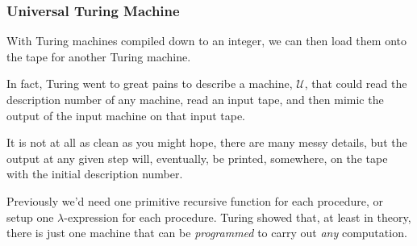 \documentclass{beamer}
\begin{document}
\begin{frame}
	\frametitle{Universal Turing Machine}

	With Turing machines compiled down to an integer, we can then load them onto the tape for another Turing machine.
	
	\vspace{0.3cm}

	In fact, Turing went to great pains to describe a machine, $\mathcal{U}$, that could read the description number of any machine, read an input tape, and then mimic the output of the input machine on that input tape. 

	\vspace{0.3cm}

	It is not at all as clean as you might hope, there are many messy details, but the output at any given step will, eventually, be printed, somewhere, on the tape with the initial description number.

	\vspace{0.5cm}

	Previously we'd need one primitive recursive function for each procedure, or setup one $\lambda$-expression for each procedure. Turing showed that, at least in theory, there is just one machine that can be \emph{programmed} to carry out \emph{any} computation. 

	
\end{frame}
\end{document}

